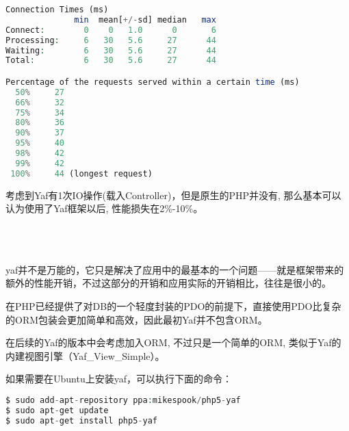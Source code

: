 \begin{compactitem}
\begin{lstlisting}[language=PHP]
Connection Times (ms)
              min  mean[+/-sd] median   max
Connect:        0    0   1.0      0       6
Processing:     6   30   5.6     27      44
Waiting:        6   30   5.6     27      44
Total:          6   30   5.6     27      44

Percentage of the requests served within a certain time (ms)
  50%     27
  66%     32
  75%     34
  80%     36
  90%     37
  95%     40
  98%     42
  99%     42
 100%     44 (longest request)
\end{lstlisting}


\end{compactitem}

考虑到Yaf有1次IO操作(载入Controller)，但是原生的PHP并没有, 那么基本可以认为使用了Yaf框架以后, 性能损失在2\%-10\%。




\begin{lstlisting}[language=PHP]

\end{lstlisting}



\begin{lstlisting}[language=PHP]

\end{lstlisting}



\begin{lstlisting}[language=PHP]

\end{lstlisting}



\begin{lstlisting}[language=PHP]

\end{lstlisting}





yaf并不是万能的，它只是解决了应用中的最基本的一个问题——就是框架带来的额外的性能开销，不过这部分的开销和应用实际的开销相比，往往是很小的。

在PHP已经提供了对DB的一个轻度封装的PDO的前提下，直接使用PDO比复杂的ORM包装会更加简单和高效，因此最初Yaf并不包含ORM。


在后续的Yaf的版本中会考虑加入ORM, 不过只是一个简单的ORM, 类似于Yaf的内建视图引擎（Yaf\_View\_Simple）。




如果需要在Ubuntu上安装yaf，可以执行下面的命令：


\begin{lstlisting}[language=PHP]
$ sudo add-apt-repository ppa:mikespook/php5-yaf
$ sudo apt-get update
$ sudo apt-get install php5-yaf
\end{lstlisting}

